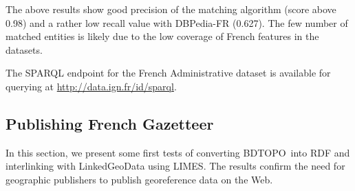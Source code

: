 The above results show good precision of the matching algorithm (score above 0.98) and a rather low recall value with DBPedia-FR (0.627). The few number of matched entities is likely due to the low coverage of French features  in the datasets.


\begin{table}[!htbp]
\end{table}

The SPARQL endpoint for the French Administrative dataset is available for querying at \url{http://data.ign.fr/id/sparql}.




\subsection{Publishing  French Gazetteer} \label{sec:bdtopo}

In this section, we present some first tests of converting BDTOPO\circledR ~into RDF and interlinking with LinkedGeoData using LIMES. The results confirm the need for geographic publishers to publish georeference data on the Web.

